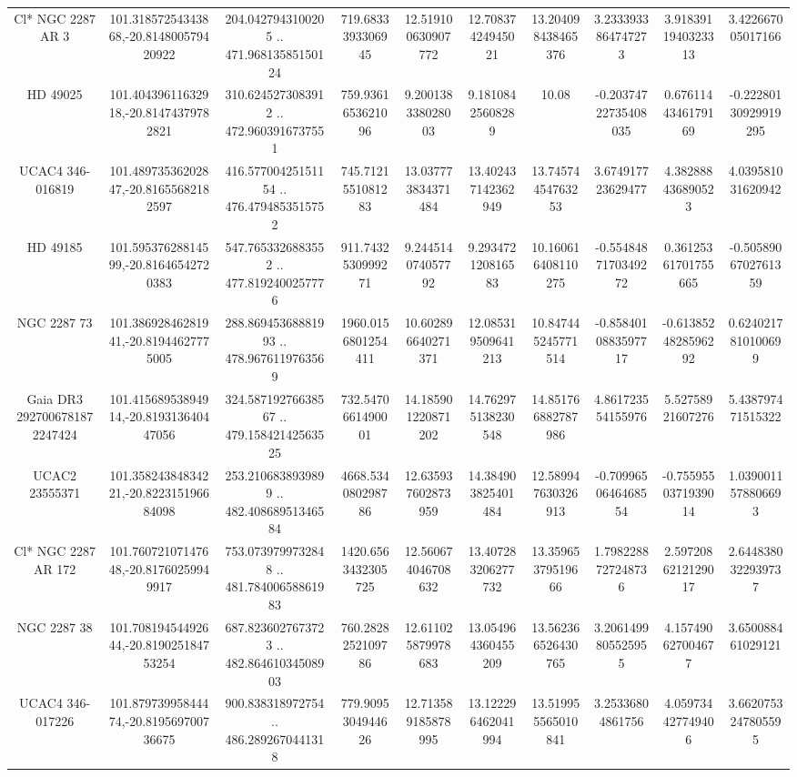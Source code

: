 \begin{table}
\begin{tabular}{cccccccccc}
Cl* NGC 2287     AR       3 & 101.31857254343868,-20.814800579420922 & 204.0427943100205 .. 471.96813585150124 & 719.6833393306945 & 12.519100630907772 & 12.70837424945021 & 13.204098438465376 & 3.2333933864747273 & 3.9183911940323313 & 3.422667005017166 \\
HD  49025 & 101.40439611632918,-20.81474379782821 & 310.6245273083912 .. 472.9603916737551 & 759.9361653621096 & 9.200138338028003 & 9.18108425608289 & 10.08 & -0.20374722735408035 & 0.6761144346179169 & -0.22280130929919295 \\
UCAC4 346-016819 & 101.48973536202847,-20.81655682182597 & 416.57700425151154 .. 476.4794853515752 & 745.7121551081283 & 13.037773834371484 & 13.402437142362949 & 13.74574454763253 & 3.674917723629477 & 4.382888436890523 & 4.039581031620942 \\
HD  49185 & 101.59537628814599,-20.81646542720383 & 547.7653326883552 .. 477.8192400257776 & 911.7432530999271 & 9.244514074057792 & 9.293472120816583 & 10.160616408110275 & -0.5548487170349272 & 0.36125361701755665 & -0.5058906702761359 \\
NGC  2287    73 & 101.38692846281941,-20.81944627775005 & 288.86945368881993 .. 478.9676119763569 & 1960.0156801254411 & 10.602896640271371 & 12.085319509641213 & 10.847445245771514 & -0.8584010883597717 & -0.6138524828596292 & 0.6240217810100699 \\
Gaia DR3 2927006781872247424 & 101.41568953894914,-20.819313640447056 & 324.58719276638567 .. 479.15842142563525 & 732.5470661490001 & 14.185901220871202 & 14.762975138230548 & 14.851766882787986 & 4.861723554155976 & 5.52758921607276 & 5.438797471515322 \\
UCAC2  23555371 & 101.35824384834221,-20.822315196684098 & 253.2106838939899 .. 482.40868951346584 & 4668.534080298786 & 12.635937602873959 & 14.384903825401484 & 12.589947630326913 & -0.7099650646468554 & -0.7559550371939014 & 1.0390011578806693 \\
Cl* NGC 2287     AR     172 & 101.76072107147648,-20.81760259949917 & 753.0739799732848 .. 481.78400658861983 & 1420.6563432305725 & 12.560674046708632 & 13.407283206277732 & 13.35965379519666 & 1.7982288727248736 & 2.5972086212129017 & 2.6448380322939737 \\
NGC  2287    38 & 101.70819454492644,-20.819025184753254 & 687.8236027673723 .. 482.86461034508903 & 760.2828252109786 & 12.611025879978683 & 13.054964360455209 & 13.562366526430765 & 3.2061499805525955 & 4.157490627004677 & 3.650088461029121 \\
UCAC4 346-017226 & 101.87973995844474,-20.819569700736675 & 900.838318972754 .. 486.2892670441318 & 779.9095304944626 & 12.713589185878995 & 13.122296462041994 & 13.519955565010841 & 3.25336804861756 & 4.059734427749406 & 3.6620753247805595 \\

\end{tabular}
\end{table}
